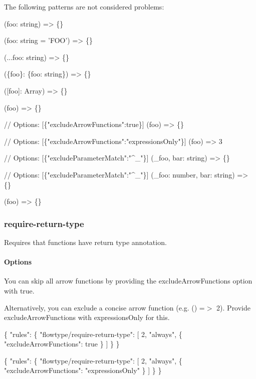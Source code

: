 The following patterns are not considered problems\+:


\begin{DoxyCode}
(foo: string) => \{\}

(foo: string = 'FOO') => \{\}

(...foo: string) => \{\}

(\{foo\}: \{foo: string\}) => \{\}

([foo]: Array) => \{\}

(foo) => \{\}

// Options: [\{"excludeArrowFunctions":true\}]
(foo) => \{\}

// Options: [\{"excludeArrowFunctions":"expressionsOnly"\}]
(foo) => 3

// Options: [\{"excludeParameterMatch":"^\_"\}]
(\_foo, bar: string) => \{\}

// Options: [\{"excludeParameterMatch":"^\_"\}]
(\_foo: number, bar: string) => \{\}

(foo) => \{\}
\end{DoxyCode}


\label{_eslint-plugin-flowtype-rules-require-return-type}%
 \subsubsection*{{\ttfamily require-\/return-\/type}}

Requires that functions have return type annotation.

\label{_eslint-plugin-flowtype-rules-require-return-type-options}%
 \paragraph*{Options}

You can skip all arrow functions by providing the {\ttfamily exclude\+Arrow\+Functions} option with {\ttfamily true}.

Alternatively, you can exclude a concise arrow function (e.\+g. {\ttfamily () =$>$ 2}). Provide {\ttfamily exclude\+Arrow\+Functions} with {\ttfamily expressions\+Only} for this.


\begin{DoxyCode}
\{
    "rules": \{
        "flowtype/require-return-type": [
            2,
            "always",
            \{
              "excludeArrowFunctions": true
            \}
        ]
    \}
\}

\{
    "rules": \{
        "flowtype/require-return-type": [
            2,
            "always",
            \{
              "excludeArrowFunctions": "expressionsOnly"
            \}
        ]
    \}
\}
\end{DoxyCode}


